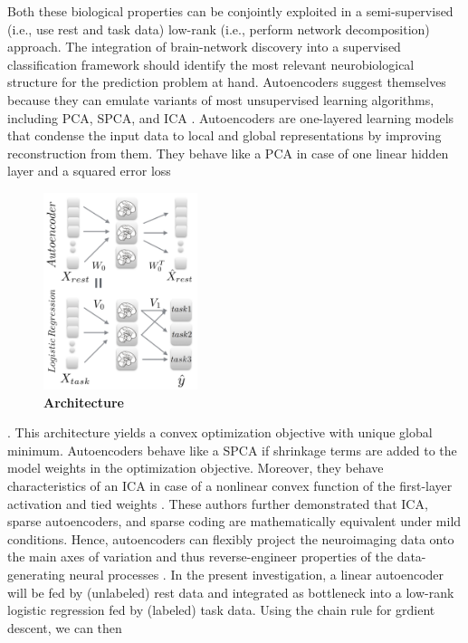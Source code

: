 \documentclass{article} %
\begin{document}
Both these biological properties can be conjointly exploited in a 
semi-supervised (i.e., use rest and task data)
low-rank (i.e., perform network decomposition)
approach.
%
The integration of brain-network discovery into a 
supervised classification framework should identify the most relevant
neurobiological structure for the prediction problem at hand.
%
Autoencoders suggest themselves because they can emulate
variants of most unsupervised learning algorithms,
including PCA, SPCA, and ICA \cite{hinton06}.
Autoencoders
are one-layered learning models that condense the input data to
local and global representations
by improving reconstruction from them.
%
They behave like a PCA
in case of one linear hidden layer and a squared error loss
%
\begin{figure}
  \centering
    \includegraphics[width=0.40\textwidth]{figures/figure1.png}
  \caption {\textbf{Architecture}
  }
\end{figure}
%
\cite{baldi1989neural}.
This architecture yields a convex optimization objective
with unique global minimum.
Autoencoders behave like a SPCA if shrinkage terms are added to the
model weights in the optimization objective.
Moreover, they behave characteristics of an ICA in case of a nonlinear convex
function of the first-layer activation and tied weights \cite{le2011ica}.
These authors further demonstrated that ICA, sparse autoencoders, and 
sparse coding are mathematically equivalent
under mild conditions.
Hence, autoencoders can flexibly project the neuroimaging data
onto the main axes of variation and thus
reverse-engineer properties of the data-generating
neural processes \cite{olshausen96}.
In the present investigation,
a linear autoencoder will be fed by (unlabeled) rest data and
integrated as bottleneck
into a low-rank logistic regression fed by (labeled) task data.
Using the chain rule for grdient descent, we can then
\end{document}
